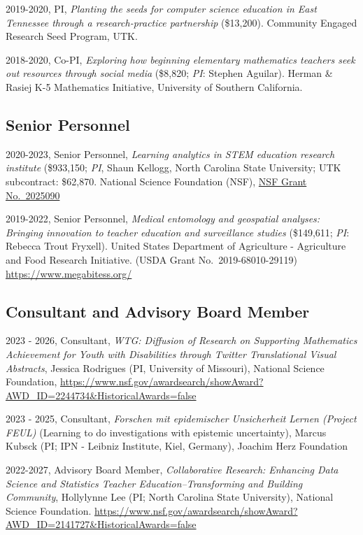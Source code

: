 \documentclass[
  14,
]{article}
\begin{document}
2019-2020, PI, \emph{Planting the seeds for computer science education
in East Tennessee through a research-practice partnership} (\$13,200).
Community Engaged Research Seed Program, UTK.

2018-2020, Co-PI, \emph{Exploring how beginning elementary mathematics
teachers seek out resources through social media} (\$8,820; \emph{PI}:
Stephen Aguilar). Herman \& Rasiej K-5 Mathematics Initiative,
University of Southern California.

\hypertarget{senior-personnel}{%
\subsection{Senior Personnel}\label{senior-personnel}}

2020-2023, Senior Personnel, \emph{Learning analytics in STEM education
research institute} (\$933,150; \emph{PI}, Shaun Kellogg, North Carolina
State University; UTK subcontract: \$62,870. National Science Foundation
(NSF),
\href{https://www.nsf.gov/awardsearch/showAward?AWD_ID=2025090\&HistoricalAwards=false}{NSF
Grant No.~2025090}

2019-2022, Senior Personnel, \emph{Medical entomology and geospatial
analyses: Bringing innovation to teacher education and surveillance
studies} (\$149,611; \emph{PI}: Rebecca Trout Fryxell). United States
Department of Agriculture - Agriculture and Food Research Initiative.
(USDA Grant No.~2019-68010-29119) \url{https://www.megabitess.org/}

\hypertarget{consultant-and-advisory-board-member}{%
\subsection{Consultant and Advisory Board
Member}\label{consultant-and-advisory-board-member}}

2023 - 2026, Consultant, \emph{WTG: Diffusion of Research on Supporting
Mathematics Achievement for Youth with Disabilities through Twitter
Translational Visual Abstracts}, Jessica Rodrigues (PI, University of
Missouri), National Science Foundation,
\url{https://www.nsf.gov/awardsearch/showAward?AWD_ID=2244734\&HistoricalAwards=false}

2023 - 2025, Consultant, \emph{Forschen mit epidemischer Unsicherheit
Lernen (Project FEUL)} (Learning to do investigations with epistemic
uncertainty), Marcus Kubsck (PI; IPN - Leibniz Institute, Kiel,
Germany), Joachim Herz Foundation

2022-2027, Advisory Board Member, \emph{Collaborative Research:
Enhancing Data Science and Statistics Teacher Education--Transforming
and Building Community}, Hollylynne Lee (PI; North Carolina State
University), National Science Foundation.
\url{https://www.nsf.gov/awardsearch/showAward?AWD_ID=2141727\&HistoricalAwards=false}
\end{document}
